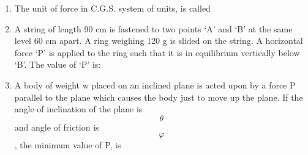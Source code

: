 \documentclass[11pt,a4paper]{article}
\begin{document}
\begin{enumerate}
\item{The unit of force in C.G.S. system of units, is called}
\\
\item{A string of length 90 cm is fastened to two points `A' and `B' at the same level 60 cm apart. A ring weighing 120 g is slided on the string. A horizontal force `P' is applied to the ring such that it is in equilibrium vertically below `B'. The value of `P' is:
}
\\
\item{A body of weight w placed on an inclined plane is acted upon by a force P parallel to the plane which causes the body just to move up the plane. If the angle of inclination of the plane is $$\theta $$ and angle of friction is $$\varphi $$, the minimum value of P, is
}
\\
\end{enumerate}
\end{document}
